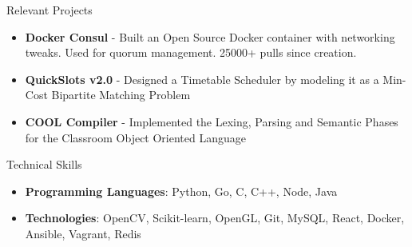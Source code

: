 \documentclass{resume}
\begin{document}
\begin{rSection}{Relevant Projects}
  \begin{itemize}[label={},topsep=0pt,itemsep=-0.5ex,partopsep=1ex,parsep=1ex,leftmargin=0.25em]
  \item  {\bf Docker Consul} - Built an Open Source Docker container with networking tweaks. Used for quorum management. 25000+ pulls since creation.
  \item {\bf QuickSlots v2.0} - Designed a Timetable Scheduler by modeling it as a Min-Cost Bipartite Matching Problem
  \item {\bf COOL Compiler} - Implemented the Lexing, Parsing and Semantic Phases for the Classroom Object Oriented Language
  \end{itemize}
\end{rSection}

\begin{rSection}{Technical Skills}

  \begin{itemize}[label={},topsep=0pt,itemsep=-0.5ex,partopsep=1ex,parsep=1ex,leftmargin=0.25em]
  \item  {\bf Programming Languages}: Python, Go, C, C++, Node, Java
  \item {\bf Technologies}: OpenCV, Scikit-learn, OpenGL, Git, MySQL, React, Docker, Ansible, Vagrant, Redis
  \end{itemize}

\end{rSection}
\end{document}
